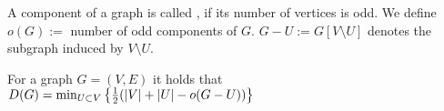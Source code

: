 \begin{lec}[2011-11-10]\end{lec}



\begin{defn}
	A component of a graph is called , if its number 
	of vertices is odd. We define $o(G):=$ number of odd components of $G$. 
	$G-U:=G[V \setminus U]$ denotes the subgraph induced by $V \setminus U$.
\end{defn}

\begin{thm}
	For a graph $G=(V,E)$ it holds that $D(G)=\min_{U \subset V} \left\{\frac{1}{2}(|V|+|U|-o(G-U))\right\}$
\end{thm}
	
